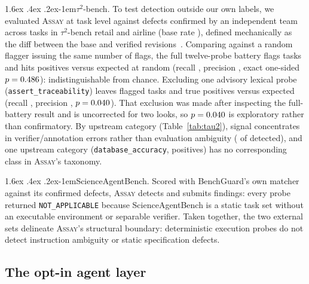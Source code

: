 \documentclass[11pt]{article}
\makeatletter
\renewcommand\paragraph{\@startsection{paragraph}{4}{\z@}%
  {1.6ex \@plus .4ex \@minus .2ex}{-1em}{\normalfont\normalsize\bfseries}}
\newcommand{\assay}{\textsc{Assay}}
\makeatother
\begin{document}
\paragraph{$\tau^2$-bench.} To test detection outside our own labels, we evaluated \assay{} at task
level against \tauPos{} defects confirmed by an independent team across \tauTasks{} tasks in
$\tau^2$-bench retail and airline (base rate \tauBase{}), defined mechanically as the diff between
the base and verified revisions~\citep{tau2verified}. Comparing against a random flagger issuing the
same number of flags, the full twelve-probe battery flags \tauAllFlag{} tasks and hits \tauAllTP{}
positives versus \tauAllExpTP{} expected at random (recall \tauAllRec{}, precision \tauAllPrec{},
exact one-sided $p=0.486{}$): indistinguishable from chance. Excluding one advisory lexical probe
(\texttt{assert\_traceability}) leaves \tauNarFlag{} flagged tasks and \tauNarTP{} true positives
versus \tauNarExpTP{} expected (recall \tauNarRec{}, precision \tauNarPrec{}, $p=0.040{}$). That
exclusion was made after inspecting the full-battery result and is uncorrected for two looks, so
$p=0.040{}$ is exploratory rather than confirmatory. By upstream category (Table~\ref{tab:tau2}),
signal concentrates in verifier/annotation errors rather than evaluation ambiguity
(\tauEvalAmbDet{} of \tauEvalAmbPos{} detected), and one upstream category (\texttt{database\_accuracy},
\tauDbPos{} positives) has no corresponding class in \assay{}'s taxonomy.

\begin{table}[t]\centering\small

\caption{Task-level recall on $\tau^2$-bench by upstream team category (all twelve probes).}
\label{tab:tau2}
\end{table}

\paragraph{ScienceAgentBench.} Scored with BenchGuard's own matcher against its \sabGold{} confirmed
defects, \assay{} detects \sabDetected{} and submits \sabFindings{} findings: every probe returned
\texttt{NOT\_APPLICABLE} because ScienceAgentBench is a static task set without an executable
environment or separable verifier. Taken together, the two external sets delineate \assay{}'s
structural boundary: deterministic execution probes do not detect instruction ambiguity or static
specification defects.

\subsection{The opt-in agent layer}
\label{sec:agent}
\end{document}
